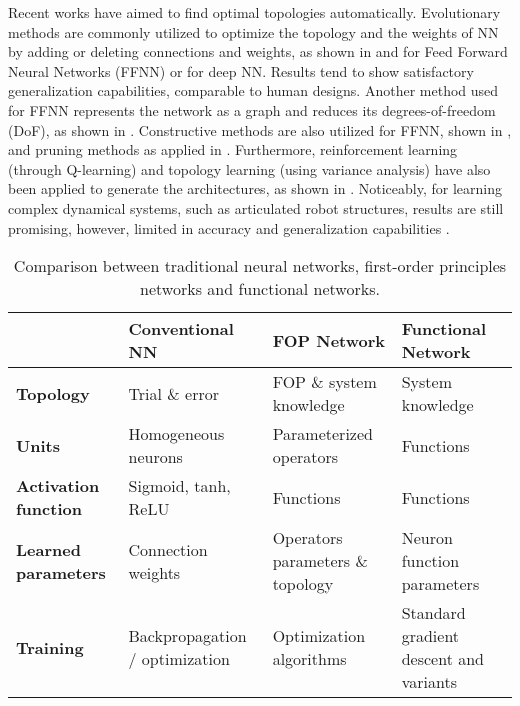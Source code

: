
Recent works have aimed to find optimal topologies automatically. Evolutionary methods are commonly utilized to optimize the topology and the weights of NN by adding or deleting connections and weights, as shown in \cite{RochaCorNev2005} and \cite{Matteucci2006} for Feed Forward Neural Networks (FFNN) or \cite{MiikkulainenLiaMeyRaw2017} for deep NN. Results tend to show satisfactory generalization capabilities, comparable to human designs. Another method used for FFNN represents the network as a graph and reduces its degrees-of-freedom (DoF), as shown in \cite{He2015}. Constructive methods are also utilized for FFNN, shown in \cite{KwokYeu1995}, and pruning methods as applied in \cite{SrinivasBab2015}. Furthermore, reinforcement learning (through Q-learning) and topology learning (using variance analysis) have also been applied to generate the architectures, as shown in \cite{BakerGupNaiRas2016}\cite{CastilloSanAloCas2007}. Noticeably, for learning complex dynamical systems, such as articulated robot structures, results are still promising, however, limited in accuracy and generalization capabilities \cite{NguyenPet2011}\cite{NguyenPetSee2008}\cite{Nguyen2010}. 

\begin{table*}[t]
\begin{center}
\begin{tabular}{ |l|l|l|l| } 
 \hline
&  \textbf{Conventional NN} &  \textbf{FOP Network} & \textbf{Functional Network}\\ 
 \hline
  \textbf{Topology} & Trial \& error & FOP \& system knowledge & System knowledge \\ 
 \hline
  \textbf{Units} & Homogeneous neurons & Parameterized operators & Functions \\ 
  \hline
  \textbf{Activation function} & Sigmoid, tanh, ReLU & Functions & Functions \\   
 \hline
 \textbf{Learned parameters} & Connection weights & Operators parameters \& topology & Neuron function parameters \\
  \hline
 \textbf{Training} & Backpropagation / optimization & Optimization algorithms  & Standard gradient descent and variants\\
 \hline
\end{tabular}
\end{center}
  \caption{Comparison between traditional neural networks, first-order principles networks and functional networks.}
  \label{tab:comparison}
\end{table*}

